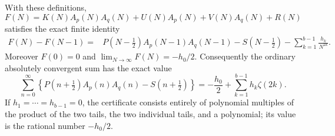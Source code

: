 \begin{theorem}
\label{tel:main}
With these definitions,
\begin{equation}\label{tel:F}
 F(N)=K(N)A_p(N)A_q(N)+U(N)A_p(N)+V(N)A_q(N)+R(N)
\end{equation}
satisfies the exact finite identity
\begin{align}\label{tel:finite}
 F(N)-F(N-1)={}&P(N-\tfrac12)A_p(N-1)A_q(N-1)
   -S(N-\tfrac12)-\sum_{k=1}^{b-1}\frac{h_k}{N^{2k}}.
\end{align}
Moreover $F(0)=0$ and $\lim_{N\to\infty}F(N)=-h_0/2$.
Consequently the ordinary absolutely convergent sum has the exact value
\begin{equation}\label{tel:evaluation}
 \boxed{\displaystyle
 \sum_{n=0}^\infty
 \left\{P(n+\tfrac12)A_p(n)A_q(n)-S(n+\tfrac12)\right\}
 =-\frac{h_0}{2}+\sum_{k=1}^{b-1}h_k\zeta(2k).}
\end{equation}
If $h_1=\cdots=h_{b-1}=0$, the certificate consists entirely of
polynomial multiples of the product of the two tails, the two individual
tails, and a polynomial; its value is the rational number $-h_0/2$.
\end{theorem}


